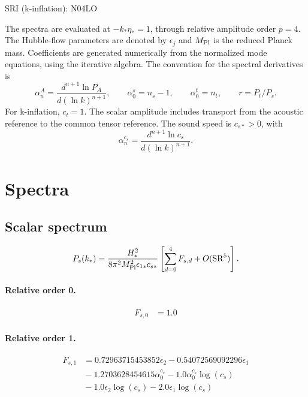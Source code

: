 \documentclass[10pt]{article}
\begin{document}
\begin{center}\Large SRI (k-inflation): N04LO\end{center}
The spectra are evaluated at $-k_*\eta_*=1$, through relative amplitude
order $p=4$. The Hubble-flow parameters are denoted by $\epsilon_j$
and $M_{\rm Pl}$ is the reduced Planck mass. Coefficients are generated
numerically from the normalized mode equations, using the iterative algebra.
The convention for the spectral derivatives is
\[
\alpha_n^A=\frac{d^{n+1}\ln P_A}{d(\ln k)^{n+1}},\qquad
\alpha_0^s=n_s-1,\qquad\alpha_0^t=n_t,\qquad r=P_t/P_s.
\]
For k-inflation, $c_t=1$. The scalar amplitude includes transport from the acoustic reference to the common tensor reference. The sound speed is $c_{s*}>0$, with
\[\alpha_n^{c_s}=\frac{d^{n+1}\ln c_s}{d(\ln k)^{n+1}}.\]
\section{Spectra}

\subsection{Scalar spectrum}
\[P_s(k_*)=\frac{H_*^2}{8\pi^2M_{\rm Pl}^2\epsilon_{1*}c_{s*}}\left[\sum_{d=0}^{4}F_{s,d}+O(\mathrm{SR}^{5})\right].\]
\paragraph{Relative order 0.}
\begin{align*}
F_{s,0} &= 1.0
\end{align*}

\paragraph{Relative order 1.}
\begin{align*}
F_{s,1} &= 0.72963715453852 \epsilon_{2} - 0.54072569092296 \epsilon_{1} \\
&{}  - 1.2703628454615 \alpha_{0}^{c_s} - 1.0 \alpha_{0}^{c_s} \log{\left(c_{s} \right)} \\
&{}  - 1.0 \epsilon_{2} \log{\left(c_{s} \right)} - 2.0 \epsilon_{1} \log{\left(c_{s} \right)}
\end{align*}
\end{document}
